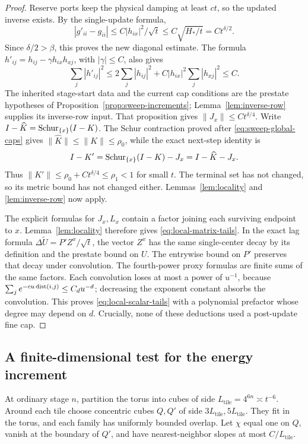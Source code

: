 \begin{proof}
Reserve ports keep the physical damping at least \(ct\), so the
updated inverse exists.  By the single-update formula,
\[
 |g'_{ii}-g_{ii}|\le C|h_{ix}|^2/\sqrt t
 \le C\sqrt{H_*/t}=Ct^{\delta/2}.
\]
Since \(\delta/2>\beta\), this proves the new diagonal estimate.
The formula \(h'_{ij}=h_{ij}-\gamma h_{ix}h_{xj}\), with
\(|\gamma|\le C\), also gives
\[
 \sum_j|h'_{ij}|^2
 \le 2\sum_j|h_{ij}|^2
       +C|h_{ix}|^2\sum_j|h_{xj}|^2\le C.
\]
The inherited stage-start data and the current cap conditions are the
prestate hypotheses of Proposition~\ref{prop:sweep-increments};
Lemma~\ref{lem:inverse-row} supplies its inverse-row input.
That proposition gives \(\|J_x\|\le Ct^{\delta/4}\).  Write
\(I-\widehat K=\operatorname{Schur}_{\{x\}}(I-K)\).  The Schur contraction proved
after \eqref{eq:sweep-global-caps} gives
\(\|\widehat K\|\le\|K\|\le\rho_0\), while the exact next-step identity is
\[
 I-K'=\operatorname{Schur}_{\{x\}}(I-K)-J_x=I-\widehat K-J_x.
\]
Thus \(\|K'\|\le\rho_0+Ct^{\delta/4}\le\rho_1<1\) for small \(t\).
The terminal set has not changed, so its metric bound
has not changed either.  Lemmas~\ref{lem:locality} and
\ref{lem:inverse-row} now apply.

The explicit formulas for \(J_x,L_x\) contain a factor joining each
surviving endpoint to \(x\).  Lemma~\ref{lem:locality} therefore gives
\eqref{eq:local-matrix-tails}.  In the exact lag formula
\(\Delta\widetilde U=P'Z^x/\sqrt t\), the vector \(Z^x\) has the
same single-center decay by its definition and the prestate bound on
\(U\).  The entrywise bound on \(P'\) preserves that decay under
convolution.  The fourth-power proxy formulas are finite sums of the
same factors.  Each convolution loses at most a power of \(u^{-1}\),
because \(\sum_j e^{-cu\operatorname{dist}(i,j)}\le C_d u^{-d}\); decreasing the
exponent constant absorbs the convolution.  This proves
\eqref{eq:local-scalar-tails} with a polynomial prefactor whose degree
may depend on \(d\).  Crucially,
none of these deductions used a post-update fine cap.
\end{proof}

\subsection{A finite-dimensional test for the energy increment}

At ordinary stage \(n\), partition the torus into cubes of side
\(L_{\mathrm{tile}}=4^{6n}\asymp t^{-6}\).  Around each tile choose concentric cubes
\(Q,Q'\) of side \(3L_{\mathrm{tile}},5L_{\mathrm{tile}}\).  They fit in the torus, and each family
has uniformly bounded overlap.  Let \(\chi\) equal one on \(Q\),
vanish at the boundary of \(Q'\), and have nearest-neighbor slopes at
most \(C/L_{\mathrm{tile}}\).

